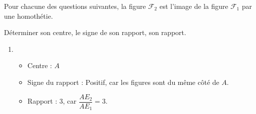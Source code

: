     Pour chacune des questions suivantes, la figure $\mathcal{F}_2$ est l'image de la figure $\mathcal{F}_1$ par une homothétie.

    Déterminer son centre, le signe de son rapport, son rapport.

    \begin{enumerate}
        \item {\color{red}
        \begin{itemize}
            \item Centre : $A$
            \item Signe du rapport : Positif, car les figures sont du même côté de $A$.
            \item Rapport :  $3$, car $\dfrac{AE_2}{AE_1}=3$.
        \end{itemize}
        }


\end{enumerate}
